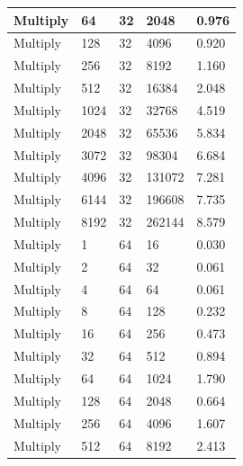 \documentclass{article}
\begin{document}
\begin{longtable}{|l|l|l|l|l|}
Multiply           & 64   & 32          & 2048              & 0.976             \\ \hline
Multiply           & 128  & 32          & 4096              & 0.920             \\ \hline
Multiply           & 256  & 32          & 8192              & 1.160             \\ \hline
Multiply           & 512  & 32          & 16384             & 2.048             \\ \hline
Multiply           & 1024 & 32          & 32768             & 4.519             \\ \hline
Multiply           & 2048 & 32          & 65536             & 5.834             \\ \hline
Multiply           & 3072 & 32          & 98304             & 6.684             \\ \hline
Multiply           & 4096 & 32          & 131072            & 7.281             \\ \hline
Multiply           & 6144 & 32          & 196608            & 7.735             \\ \hline
Multiply           & 8192 & 32          & 262144            & 8.579             \\ \hline
Multiply           & 1    & 64          & 16                & 0.030             \\ \hline
Multiply           & 2    & 64          & 32                & 0.061             \\ \hline
Multiply           & 4    & 64          & 64                & 0.061             \\ \hline
Multiply           & 8    & 64          & 128               & 0.232             \\ \hline
Multiply           & 16   & 64          & 256               & 0.473             \\ \hline
Multiply           & 32   & 64          & 512               & 0.894             \\ \hline
Multiply           & 64   & 64          & 1024              & 1.790             \\ \hline
Multiply           & 128  & 64          & 2048              & 0.664             \\ \hline
Multiply           & 256  & 64          & 4096              & 1.607             \\ \hline
Multiply           & 512  & 64          & 8192              & 2.413             \\ \hline

\end{longtable}
\end{document}

